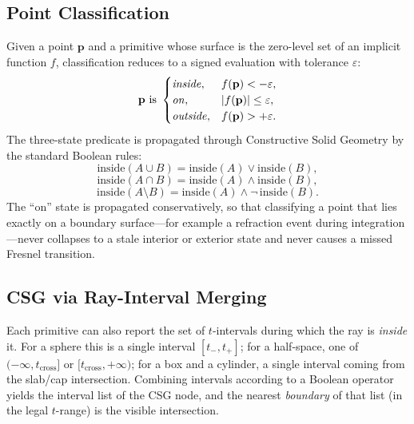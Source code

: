 \documentclass[twocolumn,10pt,cleanhead,cleanfoot]{asme2e}
\begin{document}
\subsection*{Point Classification}
Given a point $\mathbf{p}$ and a primitive whose surface is the zero-level set of an implicit function $f$, classification reduces to a signed evaluation with tolerance $\varepsilon$:
\begin{equation}
\mathbf{p}\ \text{is}\
\begin{cases}
\text{\emph{inside}}, & f(\mathbf{p}) < -\varepsilon, \\
\text{\emph{on}},     & |f(\mathbf{p})| \leq \varepsilon, \\
\text{\emph{outside}},& f(\mathbf{p}) > +\varepsilon.
\end{cases}
\label{eq:classify}
\end{equation}
The three-state predicate is propagated through Constructive Solid Geometry by the standard Boolean rules:
\begin{equation}
\mathrm{inside}(A\cup B) = \mathrm{inside}(A) \vee \mathrm{inside}(B),
\label{eq:csg-union}
\end{equation}
\begin{equation}
\mathrm{inside}(A\cap B) = \mathrm{inside}(A) \wedge \mathrm{inside}(B),
\label{eq:csg-inter}
\end{equation}
\begin{equation}
\mathrm{inside}(A\setminus B) = \mathrm{inside}(A) \wedge \neg\,\mathrm{inside}(B).
\label{eq:csg-diff}
\end{equation}
The ``on'' state is propagated conservatively, so that classifying a point that lies exactly on a boundary surface---for example a refraction event during integration---never collapses to a stale interior or exterior state and never causes a missed Fresnel transition.

\subsection*{CSG via Ray-Interval Merging}
Each primitive can also report the set of $t$-intervals during which the ray is \emph{inside} it. For a sphere this is a single interval $[t_-,t_+]$; for a half-space, one of $(-\infty,t_{\mathrm{cross}}]$ or $[t_{\mathrm{cross}},+\infty)$; for a box and a cylinder, a single interval coming from the slab/cap intersection. Combining intervals according to a Boolean operator yields the interval list of the CSG node, and the nearest \emph{boundary} of that list (in the legal $t$-range) is the visible intersection.
\end{document}
